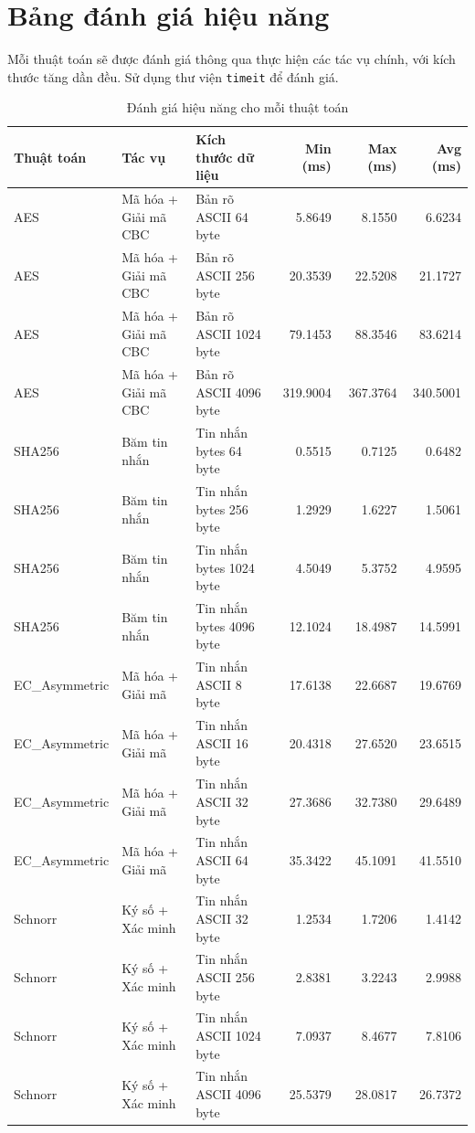 \section{Bảng đánh giá hiệu năng}

Mỗi thuật toán sẽ được đánh giá thông qua thực hiện các tác vụ chính, với kích thước tăng dần đều. Sử dụng thư viện \texttt{timeit} để đánh giá.

\begin{table}[H]
	\centering
	\small %
	\setlength{\tabcolsep}{4pt} %
	\caption{Đánh giá hiệu năng cho mỗi thuật toán}
\begin{tabularx}{\textwidth}{|l|l|X|r|r|r|}
		\hline
		Thuật toán & Tác vụ & Kích thước dữ liệu & Min (ms) & Max (ms) & Avg (ms) \\
		\hline
		AES & Mã hóa + Giải mã CBC & Bản rõ ASCII 64 byte & 5.8649 & 8.1550 & 6.6234 \\
		AES & Mã hóa + Giải mã CBC & Bản rõ ASCII 256 byte & 20.3539 & 22.5208 & 21.1727 \\
		AES & Mã hóa + Giải mã CBC & Bản rõ ASCII 1024 byte & 79.1453 & 88.3546 & 83.6214 \\
		AES & Mã hóa + Giải mã CBC & Bản rõ ASCII 4096 byte & 319.9004 & 367.3764 & 340.5001\\ \hline
		SHA256 & Băm tin nhắn & Tin nhắn bytes 64 byte & 0.5515 & 0.7125 & 0.6482 \\
		SHA256 & Băm tin nhắn & Tin nhắn bytes 256 byte & 1.2929 & 1.6227 & 1.5061 \\
		SHA256 & Băm tin nhắn & Tin nhắn bytes 1024 byte & 4.5049 & 5.3752 & 4.9595 \\
		SHA256 & Băm tin nhắn & Tin nhắn bytes 4096 byte & 12.1024 & 18.4987 & 14.5991 \\
		\hline
		EC\_Asymmetric & Mã hóa + Giải mã & Tin nhắn ASCII 8 byte & 17.6138 & 22.6687 & 19.6769 \\
		EC\_Asymmetric & Mã hóa + Giải mã & Tin nhắn ASCII 16 byte & 20.4318 & 27.6520 & 23.6515 \\
		EC\_Asymmetric & Mã hóa + Giải mã & Tin nhắn ASCII 32 byte & 27.3686 & 32.7380 & 29.6489 \\
		EC\_Asymmetric & Mã hóa + Giải mã & Tin nhắn ASCII 64 byte & 35.3422 & 45.1091 & 41.5510 \\
		\hline
		Schnorr & Ký số + Xác minh & Tin nhắn ASCII 32 byte & 1.2534 & 1.7206 & 1.4142 \\
		Schnorr & Ký số + Xác minh & Tin nhắn ASCII 256 byte & 2.8381 & 3.2243 & 2.9988 \\
		Schnorr & Ký số + Xác minh & Tin nhắn ASCII 1024 byte & 7.0937 & 8.4677 & 7.8106 \\
		Schnorr & Ký số + Xác minh & Tin nhắn ASCII 4096 byte & 25.5379 & 28.0817 & 26.7372 \\
		\hline
	\end{tabularx}
	\label{tab:danh-gia-hieu-nang-4-muc-do}
\end{table}

